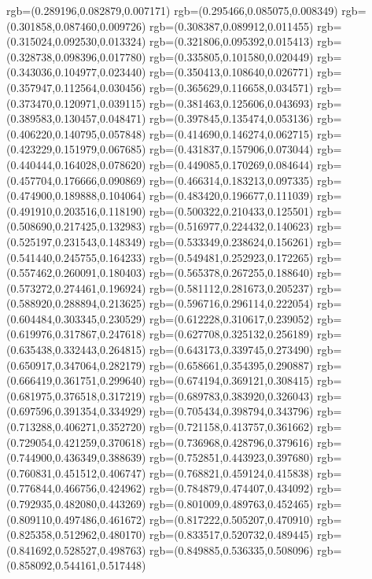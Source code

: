 {{{			rgb=(0.289196,0.082879,0.007171)
			rgb=(0.295466,0.085075,0.008349)
			rgb=(0.301858,0.087460,0.009726)
			rgb=(0.308387,0.089912,0.011455)
			rgb=(0.315024,0.092530,0.013324)
			rgb=(0.321806,0.095392,0.015413)
			rgb=(0.328738,0.098396,0.017780)
			rgb=(0.335805,0.101580,0.020449)
			rgb=(0.343036,0.104977,0.023440)
			rgb=(0.350413,0.108640,0.026771)
			rgb=(0.357947,0.112564,0.030456)
			rgb=(0.365629,0.116658,0.034571)
			rgb=(0.373470,0.120971,0.039115)
			rgb=(0.381463,0.125606,0.043693)
			rgb=(0.389583,0.130457,0.048471)
			rgb=(0.397845,0.135474,0.053136)
			rgb=(0.406220,0.140795,0.057848)
			rgb=(0.414690,0.146274,0.062715)
			rgb=(0.423229,0.151979,0.067685)
			rgb=(0.431837,0.157906,0.073044)
			rgb=(0.440444,0.164028,0.078620)
			rgb=(0.449085,0.170269,0.084644)
			rgb=(0.457704,0.176666,0.090869)
			rgb=(0.466314,0.183213,0.097335)
			rgb=(0.474900,0.189888,0.104064)
			rgb=(0.483420,0.196677,0.111039)
			rgb=(0.491910,0.203516,0.118190)
			rgb=(0.500322,0.210433,0.125501)
			rgb=(0.508690,0.217425,0.132983)
			rgb=(0.516977,0.224432,0.140623)
			rgb=(0.525197,0.231543,0.148349)
			rgb=(0.533349,0.238624,0.156261)
			rgb=(0.541440,0.245755,0.164233)
			rgb=(0.549481,0.252923,0.172265)
			rgb=(0.557462,0.260091,0.180403)
			rgb=(0.565378,0.267255,0.188640)
			rgb=(0.573272,0.274461,0.196924)
			rgb=(0.581112,0.281673,0.205237)
			rgb=(0.588920,0.288894,0.213625)
			rgb=(0.596716,0.296114,0.222054)
			rgb=(0.604484,0.303345,0.230529)
			rgb=(0.612228,0.310617,0.239052)
			rgb=(0.619976,0.317867,0.247618)
			rgb=(0.627708,0.325132,0.256189)
			rgb=(0.635438,0.332443,0.264815)
			rgb=(0.643173,0.339745,0.273490)
			rgb=(0.650917,0.347064,0.282179)
			rgb=(0.658661,0.354395,0.290887)
			rgb=(0.666419,0.361751,0.299640)
			rgb=(0.674194,0.369121,0.308415)
			rgb=(0.681975,0.376518,0.317219)
			rgb=(0.689783,0.383920,0.326043)
			rgb=(0.697596,0.391354,0.334929)
			rgb=(0.705434,0.398794,0.343796)
			rgb=(0.713288,0.406271,0.352720)
			rgb=(0.721158,0.413757,0.361662)
			rgb=(0.729054,0.421259,0.370618)
			rgb=(0.736968,0.428796,0.379616)
			rgb=(0.744900,0.436349,0.388639)
			rgb=(0.752851,0.443923,0.397680)
			rgb=(0.760831,0.451512,0.406747)
			rgb=(0.768821,0.459124,0.415838)
			rgb=(0.776844,0.466756,0.424962)
			rgb=(0.784879,0.474407,0.434092)
			rgb=(0.792935,0.482080,0.443269)
			rgb=(0.801009,0.489763,0.452465)
			rgb=(0.809110,0.497486,0.461672)
			rgb=(0.817222,0.505207,0.470910)
			rgb=(0.825358,0.512962,0.480170)
			rgb=(0.833517,0.520732,0.489445)
			rgb=(0.841692,0.528527,0.498763)
			rgb=(0.849885,0.536335,0.508096)
			rgb=(0.858092,0.544161,0.517448)
}}}
